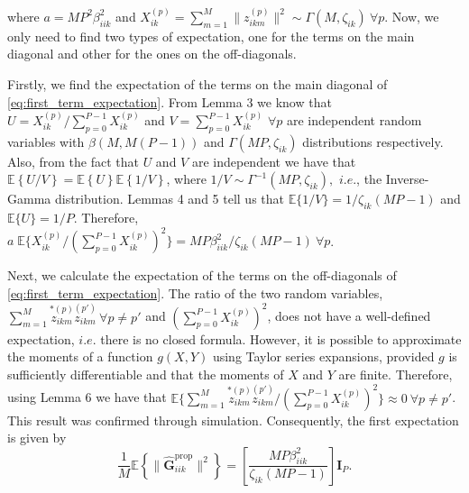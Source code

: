 \documentclass[10pt,journal,comsoc,final]{IEEEtran}
\begin{document}
where $a=M P^{2} \beta_{iik}^{2}$ and $X_{ik}^{(p)} = \sum_{m=1}^{M} \lVert z_{ikm}^{(p)} \rVert^{2} \sim \Gamma(M,\zeta_{ik}) \ \forall p$. Now, we only need to find two types of expectation, one for the terms on the main diagonal and other for the ones on the off-diagonals. 

Firstly, we find the expectation of the terms on the main diagonal of \eqref{eq:first_term_expectation}. From Lemma 3 we know that $U = X_{ik}^{(p)} / \sum_{p=0}^{P-1}{X_{ik}^{(p)}}$ and $V = \sum_{p=0}^{P-1} X_{ik}^{(p)}$ $\forall p$ are independent random variables with $\beta(M,M(P-1))$ and $\Gamma(MP,\zeta_{ik})$ distributions respectively. Also, from the fact that $U$ and $V$ are independent we have that $\mathbb{E} \left\lbrace U/V  \right\rbrace = \mathbb{E} \left\lbrace U  \right\rbrace \mathbb{E} \left\lbrace 1/V  \right\rbrace$, where $1/V \sim \Gamma^{-1}(MP, \zeta_{ik}), $ $i.e.$, the Inverse-Gamma distribution. Lemmas 4 and 5 tell us that $\mathbb{E} \{ 1/V \} = 1 / \zeta_{ik}(MP-1)$ and $\mathbb{E} \{ U \} = 1/P$. Therefore, $a \; \mathbb{E} \{ X_{ik}^{(p)} / ( \sum_{p=0}^{P-1} X_{ik}^{(p)} )^{2} \}  = MP \beta_{iik}^{2} / \zeta_{ik}(MP-1) \ \forall p$. 

Next, we calculate the expectation of the terms on the off-diagonals of \eqref{eq:first_term_expectation}. The ratio of the two random variables, $\sum_{m=1}^{M}{ \overset{*(p)}{{z}_{ikm}} \overset{(p')}{{z}_{ikm}} } \ \forall p \neq p'$ and $( \sum_{p=0}^{P-1} X_{ik}^{(p)} )^{2}$,  does not have a well-defined expectation, $i.e.$ there is no closed formula. However, it is possible to approximate the moments of a function $g(X,Y)$ using Taylor series expansions, provided $g$ is sufficiently differentiable and that the moments of $X$ and $Y$ are finite. Therefore, using Lemma 6 we have that $\mathbb{E} \{ \sum_{m=1}^{M}{ \overset{*(p)}{{z}_{ikm}} \overset{(p')}{{z}_{ikm}} } / (\sum_{p=0}^{P-1}{X_{ik}^{(p)}})^{2} \} \approx 0 \ \forall p \neq p'$. This result was confirmed through simulation. Consequently, the first expectation is given by
\begin{equation}\label{eq:first_term_expectation2}
\frac{1}{M} \mathbb{E} \left\lbrace \lVert \hat{\textbf{G}}_{iik}^{\text{prop}} \rVert^{2} \right\rbrace = \left[ \frac{MP \beta_{iik}^{2}}{\zeta_{ik}(MP-1)} \right] \textbf{I}_{P}.
\end{equation}
\end{document}
